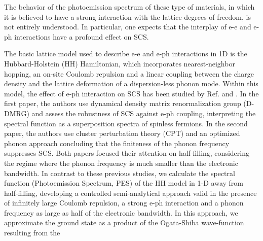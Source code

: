 \documentclass[article,11pt]{revtex4}
\begin{document}
The behavior of the photoemission spectrum of these type of
materials, in which it is believed to have a strong interaction
with the lattice degrees of freedom, is not entirely understood.
In particular, one expects that the interplay of e-e and e-ph
interactions have a profound effect on SCS.

The basic lattice model used to describe e-e and e-ph interactions
in 1D is the Hubbard-Holstein (HH) Hamiltonian, which incorporates
nearest-neighbor hopping, an on-site Coulomb repulsion and a
linear coupling between the charge density and the lattice
deformation of a dispersion-less phonon mode. Within this model,
the effect of e-ph interaction on SCS has been studied by
Ref. and . In the first paper,
the authors use dynamical density matrix renormalization group
(D-DMRG) and assess the robustness of SCS against e-ph coupling,
interpreting the spectral function as a superposition spectra of
spinless fermions. In the second paper, the authors use cluster
perturbation theory (CPT) and an optimized phonon approach
concluding that the finiteness of the phonon frequency suppresses
SCS. Both papers focused their attention on half-filling,
considering the regime where the phonon frequency is much smaller
than the electronic bandwidth.
In contrast to these previous studies, we calculate the spectral
function (Photoemission Spectrum, PES) of the HH model in
1-D away from half-filling, developing a controlled
semi-analytical approach valid in the presence of infinitely large
Coulomb repulsion, a strong e-ph interaction and a phonon
frequency as large as half of the electronic bandwidth. In this
approach, we approximate the ground state as a product of the
Ogata-Shiba wave-function\cite{Ogata1990} resulting from the
\end{document}
